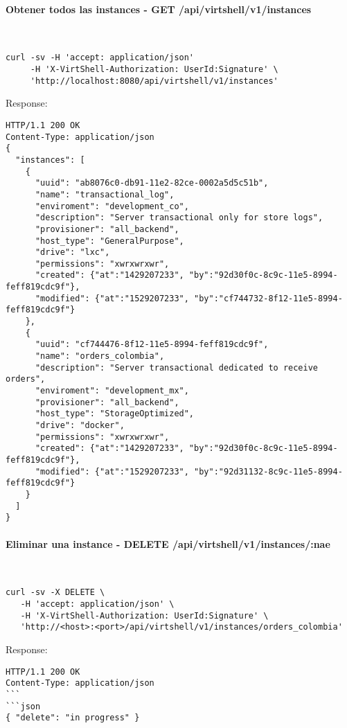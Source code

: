 \paragraph{Obtener todos las instances - GET /api/virtshell/v1/instances} ~\\

\begin{lstlisting}[style=json]
curl -sv -H 'accept: application/json' 
     -H 'X-VirtShell-Authorization: UserId:Signature' \ 
     'http://localhost:8080/api/virtshell/v1/instances'
\end{lstlisting}

Response:

\begin{lstlisting}[style=json]
HTTP/1.1 200 OK
Content-Type: application/json
{
  "instances": [
    {
      "uuid": "ab8076c0-db91-11e2-82ce-0002a5d5c51b",
      "name": "transactional_log",
      "enviroment": "development_co",
      "description": "Server transactional only for store logs", 
      "provisioner": "all_backend",
      "host_type": "GeneralPurpose",
      "drive": "lxc",
      "permissions": "xwrxwrxwr",
      "created": {"at":"1429207233", "by":"92d30f0c-8c9c-11e5-8994-feff819cdc9f"},
      "modified": {"at":"1529207233", "by":"cf744732-8f12-11e5-8994-feff819cdc9f"}
    },
    { 
      "uuid": "cf744476-8f12-11e5-8994-feff819cdc9f",
      "name": "orders_colombia",
      "description": "Server transactional dedicated to receive orders", 
      "enviroment": "development_mx",
      "provisioner": "all_backend",
      "host_type": "StorageOptimized",
      "drive": "docker",
      "permissions": "xwrxwrxwr",
      "created": {"at":"1429207233", "by":"92d30f0c-8c9c-11e5-8994-feff819cdc9f"},
      "modified": {"at":"1529207233", "by":"92d31132-8c9c-11e5-8994-feff819cdc9f"}
    }    
  ]
} 
\end{lstlisting}

\paragraph{Eliminar una instance - DELETE /api/virtshell/v1/instances/:nae} ~\\

\begin{lstlisting}[style=json]
curl -sv -X DELETE \
   -H 'accept: application/json' \
   -H 'X-VirtShell-Authorization: UserId:Signature' \
   'http://<host>:<port>/api/virtshell/v1/instances/orders_colombia'
\end{lstlisting}

Response:

\begin{lstlisting}[style=json]
HTTP/1.1 200 OK
Content-Type: application/json
```
```json
{ "delete": "in progress" }
\end{lstlisting}